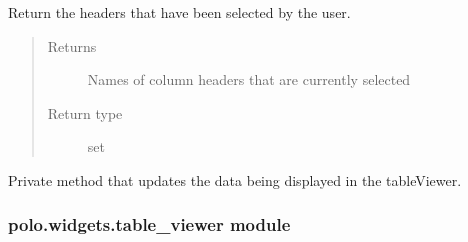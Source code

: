 \documentclass[letterpaper,10pt,english]{sphinxmanual}
\begin{document}
\begin{fulllineitems}
\begin{fulllineitems}
\end{fulllineitems}


\begin{fulllineitems}
\label{\detokenize{polo.widgets:polo.widgets.table_inspector.TableInspector.selected_headers}}
Return the headers that have been selected by the user.
\begin{quote}\begin{description}
\item[{Returns}] \leavevmode
Names of column headers that are currently selected

\item[{Return type}] \leavevmode
set

\end{description}\end{quote}

\end{fulllineitems}


\begin{fulllineitems}
\label{\detokenize{polo.widgets:polo.widgets.table_inspector.TableInspector.update_table_view}}
Private method that updates the data being displayed
in the tableViewer.

\end{fulllineitems}


\end{fulllineitems}



\subsubsection{polo.widgets.table\_viewer module}
\label{\detokenize{polo.widgets:module-polo.widgets.table_viewer}}\label{\detokenize{polo.widgets:polo-widgets-table-viewer-module}}
\end{document}
